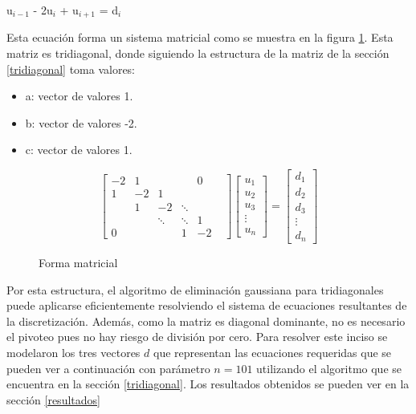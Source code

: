 u$_{i-1}$ - 2u$_{i}$ + u$_{i+1}$ = d$_{i}$

Esta ecuación forma un sistema matricial como se muestra en la figura \ref{laplaciano}. Esta matriz es tridiagonal, donde siguiendo la estructura de la matriz de la sección \ref{tridiagonal} toma valores:

\begin{itemize}
    \item a: vector de valores 1.
    \item b: vector de valores -2.
    \item c: vector de valores 1.
\end{itemize}

\begin{figure}[H]
    \[ \begin{bmatrix}
-2 & 1 & & & 0\\
1 & -2 & 1 & & & \\
    & 1 & -2 & \ddots & \\
    &    & \ddots &  \ddots & 1\\
0   &    &   & 1 & -2
     \end{bmatrix}
     \begin{bmatrix}
           u_{1}\\
           u_{2} \\
           u_{3}\\ 
           \vdots\\ 
           u_{n}  
     \end{bmatrix}
      =
     \begin{bmatrix}
          d_{1} \\
          d_{2}\\
          d_{3}\\
         \vdots\\ 
         d_{n}  
     \end{bmatrix} \]
     \caption{Forma matricial}\label{laplaciano}
\end{figure}
Por esta estructura,  el algoritmo de eliminación gaussiana para tridiagonales puede aplicarse eficientemente resolviendo el sistema de ecuaciones resultantes de la discretización. Además, como la matriz es diagonal dominante, no es necesario el pivoteo pues no hay riesgo de división por cero. 
Para resolver este inciso se modelaron los tres vectores $d$ que representan las ecuaciones requeridas que se pueden ver a continuación con parámetro $n=101$ utilizando el algoritmo que se encuentra en la sección \ref{tridiagonal}.
Los resultados obtenidos se pueden ver en la sección \ref{resultados} 

